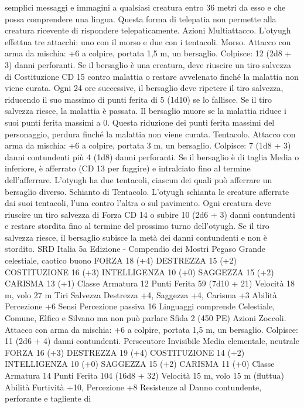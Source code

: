 \begin{multicols}{2}
semplici messaggi e immagini a qualsiasi creatura entro 36 metri
da esso e che possa comprendere una lingua. Questa forma di
telepatia non permette alla creatura ricevente di rispondere
telepaticamente.
Azioni
Multiattacco. L’otyugh effettua tre attacchi: uno con il morso e
due con i tentacoli.
Morso. Attacco con arma da mischia: +6 a colpire, portata 1,5
m, un bersaglio.
Colpisce: 12 (2d8 + 3) danni perforanti. Se il bersaglio è una
creatura, deve riuscire un tiro salvezza di Costituzione CD 15
contro malattia o restare avvelenato finché la malattia non viene
curata. Ogni 24 ore successive, il bersaglio deve ripetere il tiro
salvezza, riducendo il suo massimo di punti ferita di 5 (1d10) se
lo fallisce. Se il tiro salvezza riesce, la malattia è passata. Il
bersaglio muore se la malattia riduce i suoi punti ferita massimi a
0. Questa riduzione dei punti ferita massimi del personaggio,
perdura finché la malattia non viene curata.
Tentacolo. Attacco con arma da mischia: +6 a colpire, portata 3
m, un bersaglio.
Colpisce: 7 (1d8 + 3) danni contundenti più 4 (1d8) danni
perforanti. Se il bersaglio è di taglia Media o inferiore, è
afferrato (CD 13 per fuggire) e intralciato fino al termine
dell’afferrare. L’otyugh ha due tentacoli, ciascun dei quali può
afferrare un bersaglio diverso.
Schianto di Tentacolo. L’otyugh schianta le creature afferrate
dai suoi tentacoli, l’una contro l’altra o sul pavimento. Ogni
creatura deve riuscire un tiro salvezza di Forza CD 14 o subire
10 (2d6 + 3) danni contundenti e restare stordita fino al termine
del prossimo turno dell’otyugh. Se il tiro salvezza riesce, il
bersaglio subisce la metà dei danni contundenti e non è stordito.
SRD Italia 5a Edizione - Compendio dei Mostri
Pegaso
Grande celestiale, caotico buono
FORZA 18 (+4)
DESTREZZA 15 (+2)
COSTITUZIONE 16 (+3)
INTELLIGENZA 10 (+0)
SAGGEZZA 15 (+2)
CARISMA 13 (+1)
Classe Armatura 12
Punti Ferita 59 (7d10 + 21)
Velocità 18 m, volo 27 m
Tiri Salvezza Destrezza +4, Saggezza +4, Carisma +3
Abilità Percezione +6
Sensi Percezione passiva 16
Linguaggi comprende Celestiale, Comune, Elfico e Silvano ma
non può parlare
Sfida 2 (450 PE)
Azioni
Zoccoli. Attacco con arma da mischia: +6 a colpire, portata 1,5
m, un bersaglio.
Colpisce: 11 (2d6 + 4) danni contundenti.
Persecutore Invisibile
Media elementale, neutrale
FORZA 16 (+3)
DESTREZZA 19 (+4)
COSTITUZIONE 14 (+2)
INTELLIGENZA 10 (+0)
SAGGEZZA 15 (+2)
CARISMA 11 (+0)
Classe Armatura 14
Punti Ferita 104 (16d8 + 32)
Velocità 15 m, volo 15 m (fluttua)
Abilità Furtività +10, Percezione +8
Resistenze al Danno contundente, perforante e tagliente di

\end{multicols}
